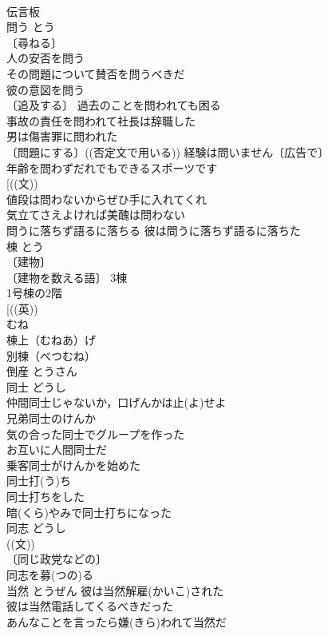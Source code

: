 \documentclass[8pt]{extreport}
\begin{document}
\begin{CJK}{UTF8}{min}
\\	伝言板 
\\	問う	とう	
\\	〔尋ねる〕
\\	人の安否を問う 
\\	その問題について賛否を問うべきだ 
\\	彼の意図を問う 
\\	〔追及する〕 過去のことを問われても困る 
\\	事故の責任を問われて社長は辞職した 
\\	男は傷害罪に問われた 
\\	〔問題にする〕((否定文で用いる)) 経験は問いません〔広告で〕 
\\	年齢を問わずだれでもできるスポーツです 
\\	[((文))
\\	値段は問わないからぜひ手に入れてくれ 
\\	気立てさえよければ美醜は問わない 
\\	問うに落ちず語るに落ちる 彼は問うに落ちず語るに落ちた 
\\	棟	とう	
\\	〔建物〕
\\	〔建物を数える語〕 3棟 
\\	1号棟の2階 
\\	[((英)) 
\\	むね 
\\	棟上（むねあ）げ 
\\	別棟（べつむね） 
\\	倒産	とうさん	
\\	同士	どうし	
\\	仲間同士じゃないか，口げんかは止(よ)せよ 
\\	兄弟同士のけんか 
\\	気の合った同士でグループを作った 
\\	お互いに人間同士だ 
\\	乗客同士がけんかを始めた 
\\	同士打(う)ち 
\\	同士打ちをした 
\\	暗(くら)やみで同士打ちになった 
\\	同志	どうし	
\\	((文)) 
\\	〔同じ政党などの〕
\\	同志を募(つの)る 
\\	当然	とうぜん	彼は当然解雇(かいこ)された 
\\	彼は当然電話してくるべきだった 
\\	あんなことを言ったら嫌(きら)われて当然だ 

\end{CJK}
\end{document}
